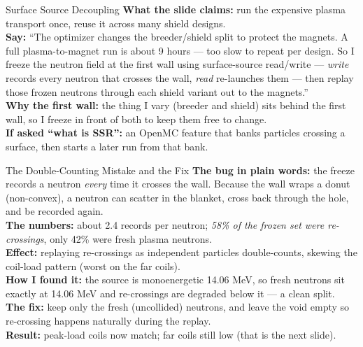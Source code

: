 \documentclass[aspectratio=169]{beamer}
\newcommand{\lab}[1]{\textcolor{acc}{\textbf{#1}}}
\begin{document}
\begin{frame}{Surface Source Decoupling}
  \small
  \lab{What the slide claims:} run the expensive plasma transport once, reuse it across many shield designs.\\[3pt]
  \lab{Say:} ``The optimizer changes the breeder/shield split to protect the magnets. A full plasma-to-magnet run is about 9 hours --- too slow to repeat per design. So I freeze the neutron field at the first wall using surface-source read/write --- \emph{write} records every neutron that crosses the wall, \emph{read} re-launches them --- then replay those frozen neutrons through each shield variant out to the magnets.''\\[3pt]
  \lab{Why the first wall:} the thing I vary (breeder and shield) sits behind the first wall, so I freeze in front of both to keep them free to change.\\[3pt]
  \lab{If asked ``what is SSR'':} an OpenMC feature that banks particles crossing a surface, then starts a later run from that bank.
\end{frame}

\begin{frame}{The Double-Counting Mistake and the Fix}
  \small
  \lab{The bug in plain words:} the freeze records a neutron \emph{every} time it crosses the wall. Because the wall wraps a donut (non-convex), a neutron can scatter in the blanket, cross back through the hole, and be recorded again.\\[3pt]
  \lab{The numbers:} about 2.4 records per neutron; \emph{58\% of the frozen set were re-crossings}, only 42\% were fresh plasma neutrons.\\[3pt]
  \lab{Effect:} replaying re-crossings as independent particles double-counts, skewing the coil-load pattern (worst on the far coils).\\[3pt]
  \lab{How I found it:} the source is monoenergetic 14.06 MeV, so fresh neutrons sit exactly at 14.06 MeV and re-crossings are degraded below it --- a clean split.\\[3pt]
  \lab{The fix:} keep only the fresh (uncollided) neutrons, and leave the void empty so re-crossing happens naturally during the replay.\\[3pt]
  \lab{Result:} peak-load coils now match; far coils still low (that is the next slide).
\end{frame}
\end{document}
